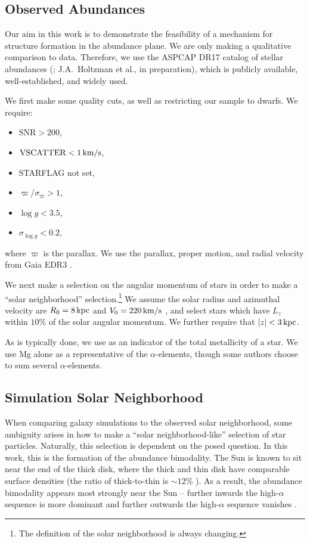 \subsection{Observed Abundances}\label{ssec:obs_abund}
Our aim in this work is to demonstrate the feasibility of a mechanism for structure formation in the abundance plane. We are only making a qualitative comparison to data. Therefore, we use the ASPCAP DR17 catalog of stellar abundances (\citet{2016AJ....151..144G}; J.A.~Holtzman et al., in preparation), which is publicly available, well-established, and widely used.

We first make some quality cuts, as well as restricting our sample to dwarfs. We require:
\begin{itemize}[noitemsep]
    \item $\textrm{SNR} > 200$,
    \item $\textrm{VSCATTER} < 1\,\textrm{km}/\textrm{s}$,
    \item STARFLAG not set,
    \item $\varpi/\sigma_{\varpi} > 1$,
    \item $\log{g} < 3.5$,
    \item $\sigma_{\log{g}} < 0.2$,
\end{itemize}
where $\varpi$ is the parallax. We use the parallax, proper motion, and radial velocity from Gaia EDR3 \citep{2016AA...595A...1G, 2021AA...649A...1G, 2021AA...649A...2L, 2021AA...653A.160S}.

We next make a selection on the angular momentum of stars in order to make a ``solar neighborhood'' selection.\footnote{The definition of the solar neighborhood is always changing.} We assume the solar radius and azimuthal velocity are $R_0=8\,\textrm{kpc}$ and $V_0=220\,\textrm{km}/\textrm{s}$ , and select stars which have $L_z$ within $10\%$ of the solar angular momentum. We further require that $\left|z\right| < 3\,\textrm{kpc}$.

As is typically done, we use \FeH{} as an indicator of the total metallicity of a star. We use Mg alone as a representative of the $\alpha$-elements, though some authors choose to sum several $\alpha$-elements.

\subsection{Simulation Solar Neighborhood}\label{ssec:solarneigh}
When comparing galaxy simulations to the observed solar neighborhood, some ambiguity arises in how to make a ``solar neighborhood-like'' selection of star particles. Naturally, this selection is dependent on the posed question. In this work, this is the formation of the abundance bimodality. The Sun is known to sit near the end of the thick disk, where the thick and thin disk have comparable surface densities (the ratio of thick-to-thin is $\sim12\%$ ). As a result, the abundance bimodality appears most strongly near the Sun -- further inwards the high-$\alpha$ sequence is more dominant and further outwards the high-$\alpha$ sequence vanishes .

